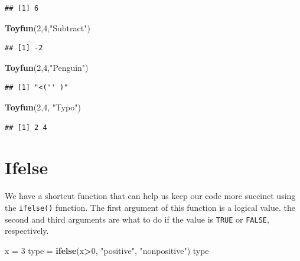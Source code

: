 \documentclass[
]{book}
\newenvironment{Shaded}{\begin{snugshade}}{\end{snugshade}}
\newcommand{\DecValTok}[1]{\textcolor[rgb]{0.00,0.00,0.81}{#1}}
\newcommand{\KeywordTok}[1]{\textcolor[rgb]{0.13,0.29,0.53}{\textbf{#1}}}
\newcommand{\NormalTok}[1]{#1}
\newcommand{\OperatorTok}[1]{\textcolor[rgb]{0.81,0.36,0.00}{\textbf{#1}}}
\newcommand{\StringTok}[1]{\textcolor[rgb]{0.31,0.60,0.02}{#1}}
\begin{document}
\begin{verbatim}
## [1] 6
\end{verbatim}

\begin{Shaded}
\begin{Highlighting}[]
\KeywordTok{Toyfun}\NormalTok{(}\DecValTok{2}\NormalTok{,}\DecValTok{4}\NormalTok{,}\StringTok{"Subtract"}\NormalTok{)}
\end{Highlighting}
\end{Shaded}

\begin{verbatim}
## [1] -2
\end{verbatim}

\begin{Shaded}
\begin{Highlighting}[]
\KeywordTok{Toyfun}\NormalTok{(}\DecValTok{2}\NormalTok{,}\DecValTok{4}\NormalTok{,}\StringTok{"Penguin"}\NormalTok{)}
\end{Highlighting}
\end{Shaded}

\begin{verbatim}
## [1] "<('' )"
\end{verbatim}

\begin{Shaded}
\begin{Highlighting}[]
\KeywordTok{Toyfun}\NormalTok{(}\DecValTok{2}\NormalTok{,}\DecValTok{4}\NormalTok{, }\StringTok{"Typo"}\NormalTok{)}
\end{Highlighting}
\end{Shaded}

\begin{verbatim}
## [1] 2 4
\end{verbatim}

\hypertarget{ifelse}{%
\section{Ifelse}\label{ifelse}}

We have a shortcut function that can help us keep our code more succinct using the \texttt{ifelse()} function. The first argument of this function is a logical value. the second and third arguments are what to do if the value is \texttt{TRUE} or \texttt{FALSE}, respectively.

\begin{Shaded}
\begin{Highlighting}[]
\NormalTok{x =}\StringTok{ }\DecValTok{3}
\NormalTok{type =}\StringTok{ }\KeywordTok{ifelse}\NormalTok{(x}\OperatorTok{>}\DecValTok{0}\NormalTok{,  }\StringTok{"positive"}\NormalTok{, }\StringTok{"nonpositive"}\NormalTok{)}
\NormalTok{type }
\end{Highlighting}
\end{Shaded}
\end{document}
